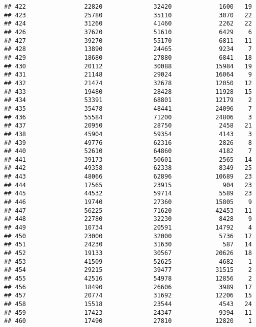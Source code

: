 \documentclass[
]{article}
\begin{document}
\begin{verbatim}
## 422                22820              32420             1600   19
## 423                25780              35110             3070   22
## 424                31260              41460             2262   22
## 426                37620              51610             6429    6
## 427                39270              55170             6811   11
## 428                13890              24465             9234    7
## 429                18680              27880             6841   18
## 430                20112              30088            15984   19
## 431                21148              29024            16064    9
## 432                21474              32678            12050   12
## 433                19480              28428            11928   15
## 434                53391              68801            12179    2
## 435                35478              48441            24096    7
## 436                55584              71200            24806    3
## 437                20950              28750             2458   21
## 438                45904              59354             4143    3
## 439                49776              62316             2826    8
## 440                52610              64860             4182    7
## 441                39173              50601             2565   14
## 442                49358              62338             8349   25
## 443                48066              62896            10689   23
## 444                17565              23915              904   23
## 445                44532              59714             5589   23
## 446                19740              27360            15805    9
## 447                56225              71620            42453   11
## 448                22780              32230             8428    9
## 449                10734              20591            14792    4
## 450                23000              32000             5736   17
## 451                24230              31630              587   14
## 452                19133              30567            20626   18
## 453                41509              52625             4682    1
## 454                29215              39477            31515    2
## 455                42516              54978            12856    2
## 456                18490              26606             3989   17
## 457                20774              31692            12206   15
## 458                15518              23544             4543   24
## 459                17423              24347             9394   11
## 460                17490              27810            12820    1

\end{verbatim}
\end{document}
